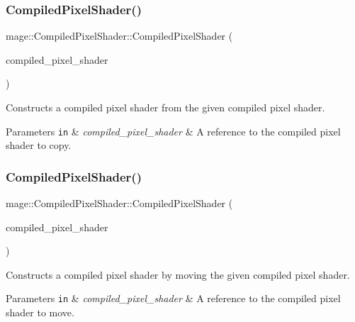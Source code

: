 \subsubsection{\texorpdfstring{Compiled\+Pixel\+Shader()}{CompiledPixelShader()}\hspace{0.1cm}{\footnotesize\ttfamily [2/3]}}
{\footnotesize\ttfamily mage\+::\+Compiled\+Pixel\+Shader\+::\+Compiled\+Pixel\+Shader (\begin{DoxyParamCaption}\item[{const \hyperlink{structmage_1_1_compiled_pixel_shader}{Compiled\+Pixel\+Shader} \&}]{compiled\+\_\+pixel\+\_\+shader }\end{DoxyParamCaption})\hspace{0.3cm}{\ttfamily [default]}}

Constructs a compiled pixel shader from the given compiled pixel shader.


\begin{DoxyParams}[1]{Parameters}
\mbox{\tt in}  & {\em compiled\+\_\+pixel\+\_\+shader} & A reference to the compiled pixel shader to copy. \\
\hline
\end{DoxyParams}
\hypertarget{structmage_1_1_compiled_pixel_shader_a472407078fe751a18d8c2ffe6e6bbef5}{}\label{structmage_1_1_compiled_pixel_shader_a472407078fe751a18d8c2ffe6e6bbef5} 
\subsubsection{\texorpdfstring{Compiled\+Pixel\+Shader()}{CompiledPixelShader()}\hspace{0.1cm}{\footnotesize\ttfamily [3/3]}}
{\footnotesize\ttfamily mage\+::\+Compiled\+Pixel\+Shader\+::\+Compiled\+Pixel\+Shader (\begin{DoxyParamCaption}\item[{\hyperlink{structmage_1_1_compiled_pixel_shader}{Compiled\+Pixel\+Shader} \&\&}]{compiled\+\_\+pixel\+\_\+shader }\end{DoxyParamCaption})\hspace{0.3cm}{\ttfamily [default]}}

Constructs a compiled pixel shader by moving the given compiled pixel shader.


\begin{DoxyParams}[1]{Parameters}
\mbox{\tt in}  & {\em compiled\+\_\+pixel\+\_\+shader} & A reference to the compiled pixel shader to move. \\
\hline
\end{DoxyParams}
\hypertarget{structmage_1_1_compiled_pixel_shader_aa108e83f2afcc6ade97f3dbaa526dee1}{}\label{structmage_1_1_compiled_pixel_shader_aa108e83f2afcc6ade97f3dbaa526dee1} 
